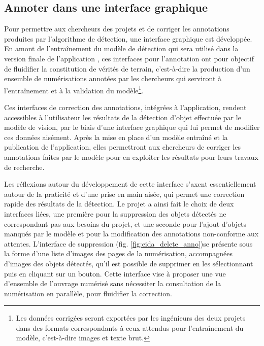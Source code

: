 \subsection{Annoter dans une interface graphique}
Pour permettre aux chercheurs des projets \eida et \vhs de corriger les annotations produites par l'algorithme de détection, une interface graphique est développée. En amont de l'entraînement du modèle de détection qui sera utilisé dans la version finale de l'application \eida, ces interfaces pour l'annotation ont pour objectif de fluidifier la constitution de vérités de terrain, c'est-à-dire la production d'un ensemble de numérisations annotées par les chercheurs qui serviront à l'entraînement et à la validation du modèle\footnote{Les données corrigées seront exportées par les ingénieurs des deux projets dans des formats correspondants à ceux attendus pour l'entraînement du modèle, c'est-à-dire images et texte brut.}.
 
Ces interfaces de correction des annotations, intégrées à l'application, rendent accessibles à l'utilisateur les résultats de la détection d'objet effectuée par le modèle de vision, par le biais d'une interface graphique qui lui permet de modifier ces données aisément. Après la mise en place d'un modèle entraîné et la publication de l'application, elles permettront aux chercheurs de corriger les annotations faites par le modèle pour en exploiter les résultats pour leurs travaux de recherche.

Les réflexions autour du développement de cette interface s'axent essentiellement autour de la praticité et d'une prise en main aisée, qui permet une correction rapide des résultats de la détection. Le projet \eida a ainsi fait le choix de deux interfaces liées, une première pour la suppression des objets détectés ne correspondant pas aux besoins du projet, et une seconde pour l'ajout d'objets manqués par le modèle et pour la modification des annotations non-conforme aux attentes. L'interface de suppression (fig. \ref{fig:eida_delete_anno})se présente sous la forme d'une liste d'images des pages de la numérisation, accompagnées d'images des objets détectés, qu'il est possible de supprimer en les sélectionnant puis en cliquant sur un bouton. Cette interface vise à proposer une vue d'ensemble de l'ouvrage numérisé sans nécessiter la consultation de la numérisation en parallèle, pour fluidifier la correction.
 	
